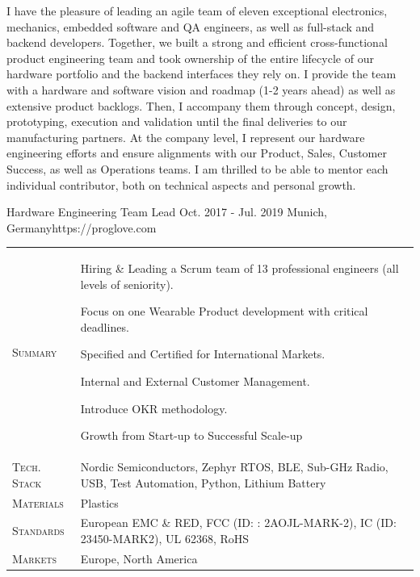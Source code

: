 \documentclass[10pt,a4paper]{moderncv}
\begin{document}
  \begin{minipage}{\textwidth}
    \small
    I have the pleasure of leading an agile team of eleven exceptional electronics, mechanics, embedded software and QA engineers, as well as full-stack and backend developers. Together, we built a strong and efficient cross-functional product engineering team and took ownership of the entire lifecycle of our hardware portfolio and the backend interfaces they rely on. I provide the team with a hardware and software vision and roadmap (1-2 years ahead) as well as extensive product backlogs. Then, I accompany them through concept, design, prototyping, execution and validation until the final deliveries to our manufacturing partners. At the company level, I represent our hardware engineering efforts and ensure alignments with our Product, Sales, Customer Success, as well as Operations teams. I am thrilled to be able to mentor each individual contributor, both on technical aspects and personal growth.
  \end{minipage}
  

  {Hardware Engineering Team Lead}
  {Oct. 2017 - Jul. 2019}
  {Munich, Germany}{https://proglove.com}

  \begin{tabularx}{\textwidth}{>{\scshape}l@{\hskip 3.5mm}L}
    Summary & Hiring \& Leading a Scrum team of 13 professional engineers (all levels of seniority).
    \par Focus on one Wearable Product development with critical deadlines.
    \par Specified and Certified for International Markets.
    \par Internal and External Customer Management. 
    \par Introduce OKR methodology.
    \par Growth from Start-up to Successful Scale-up\\
    Tech. Stack & Nordic Semiconductors, Zephyr RTOS, BLE, Sub-GHz Radio, USB, Test Automation, Python, Lithium Battery\\
    Materials & Plastics\\
    Standards & European EMC \& RED, FCC (ID: : 2AOJL-MARK-2), IC (ID: 23450-MARK2), UL 62368, RoHS\\
    Markets & Europe, North America\\
  \end{tabularx}

  \vspace{1.5em}
  
\end{document}
